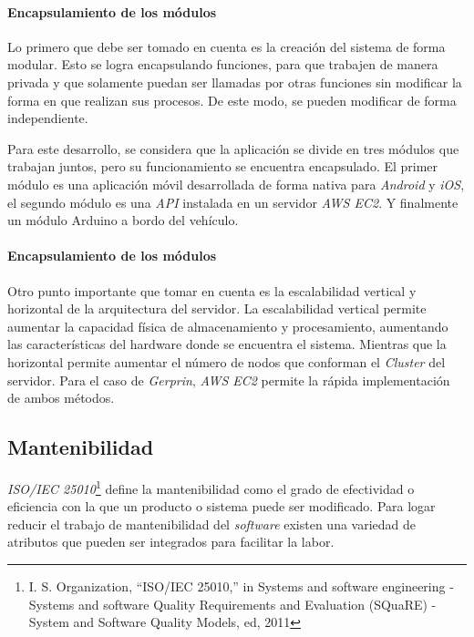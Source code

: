 \paragraph{Encapsulamiento de los módulos\\}

Lo primero que debe ser tomado en cuenta es la creación del sistema de forma modular. Esto se logra encapsulando funciones, para que trabajen de manera privada y que solamente puedan ser llamadas por otras funciones sin modificar la forma en que realizan sus procesos. De este modo, se pueden modificar de forma independiente. 

Para este desarrollo, se considera que la aplicación se divide en tres módulos que trabajan juntos, pero su funcionamiento se encuentra encapsulado. El primer módulo es una aplicación móvil desarrollada de forma nativa para \emph{Android} y \emph{iOS}, el segundo módulo es una \emph{API} instalada en un servidor \emph{AWS EC2}. Y finalmente un módulo Arduino a bordo del vehículo. 

\paragraph{Encapsulamiento de los módulos\\}

Otro punto importante que tomar en cuenta es la escalabilidad vertical y horizontal de la arquitectura del servidor. La escalabilidad vertical permite aumentar la capacidad física de almacenamiento y procesamiento, aumentando las características del hardware donde se encuentra el sistema. Mientras que la horizontal permite aumentar el número de nodos que conforman el \emph{Cluster} del servidor. Para el caso de \emph{Gerprin}, \emph{AWS EC2} permite la rápida implementación de ambos métodos.

\subsection{Mantenibilidad}

\emph{ISO/IEC 25010}\footnote{I. S. Organization, “ISO/IEC 25010,” in Systems and software engineering - Systems and software Quality Requirements and Evaluation (SQuaRE) - System and Software Quality Models, ed, 2011} define la mantenibilidad como el grado de efectividad o eficiencia con la que un producto o sistema puede ser modificado. Para logar reducir el trabajo de mantenibilidad del \emph{software} existen una variedad de atributos que pueden ser integrados para facilitar la labor. 


